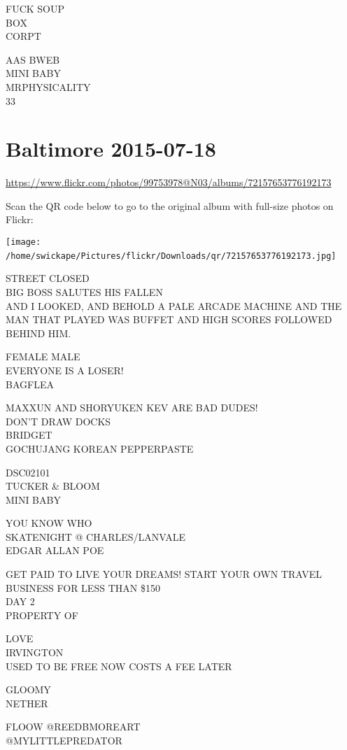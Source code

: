 \documentclass[10pt,letterpaper]{article}
\begin{document}
FUCK SOUP\\
BOX\\
CORPT

AAS BWEB\\
MINI BABY\\
MRPHYSICALITY\\
33
\

\section*{Baltimore 2015-07-18}

\url{https://www.flickr.com/photos/99753978@N03/albums/72157653776192173}

Scan the QR code below to go to the original album with full-size photos on Flickr:

\texttt{[image: /home/swickape/Pictures/flickr/Downloads/qr/72157653776192173.jpg]}
\

STREET CLOSED\\
BIG BOSS SALUTES HIS FALLEN\\
AND I LOOKED, AND BEHOLD A PALE ARCADE MACHINE AND THE MAN THAT PLAYED WAS BUFFET AND HIGH SCORES FOLLOWED BEHIND HIM.

FEMALE MALE\\
EVERYONE IS A LOSER!\\
BAGFLEA

MAXXUN AND SHORYUKEN KEV ARE BAD DUDES!\\
DON'T DRAW DOCKS\\
BRIDGET\\
GOCHUJANG KOREAN PEPPERPASTE

DSC02101\\
TUCKER \& BLOOM\\
MINI BABY

YOU KNOW WHO\\
SKATENIGHT @ CHARLES/LANVALE\\
EDGAR ALLAN POE

GET PAID TO LIVE YOUR DREAMS!  START YOUR OWN TRAVEL BUSINESS FOR LESS THAN \$150\\
DAY 2\\
PROPERTY OF

LOVE\\
IRVINGTON\\
USED TO BE FREE NOW COSTS A FEE LATER

GLOOMY\\
NETHER

FLOOW @REEDBMOREART\\
@MYLITTLEPREDATOR
\end{document}
